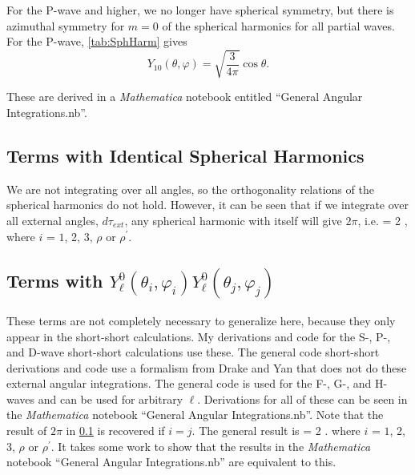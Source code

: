 \documentclass[Dissertation.tex]{subfiles}
\begin{document}
For the P-wave and higher, we no longer have spherical symmetry, but there is
azimuthal symmetry for $m = 0$ of the spherical harmonics for all partial 
waves. For the P-wave,
\cref{tab:SphHarm} gives
\begin{equation}
Y_{10}(\theta,\varphi) = \sqrt{\frac{3}{4\pi}} \cos\theta.
\end{equation}






These are derived in a \emph{Mathematica} notebook entitled ``General Angular Integrations.nb''.



\subsection{Terms with Identical Spherical Harmonics}
\label{sec:AngSame}
We are not integrating over all angles, so the orthogonality relations of the
spherical harmonics do not hold. However, it can be seen that if we integrate
over all external angles, $d\tau_{ext}$, any spherical harmonic with itself
will give $2\pi$, i.e.
\beq
\label{eq:AngSame}
 = 2 \pi,
\eeq
where $i$ = $1$, 2, 3, $\rho$ or $\rho^\prime$.


\subsection{Terms with \texorpdfstring{$Y_\ell^0(\theta_i, \varphi_i) Y_\ell^0(\theta_j, \varphi_j)$}{Yi-Yj} }
\label{sec:AngRiRj}

These terms are not completely necessary to generalize here, because they 
only appear in the short-short calculations. My derivations and code for the 
S-, P-, and D-wave short-short calculations use these. The general code
short-short derivations and code \cite{sec:} use a formalism from Drake and
Yan \cite{Yan1997} that does not do these external angular integrations. The 
general code is used for the F-, G-, and H-waves and can be used for 
arbitrary $\ell$. Derivations for all of these can be seen in the
\emph{Mathematica} notebook ``General Angular Integrations.nb''. Note that the
result of $2\pi$ in \cref{sec:AngSame} is recovered if $i=j$. The general 
result is
\beq
\label{eq:AngRiRj}
 = 2 \pi {}.
\eeq
where $i$ = $1$, 2, 3, $\rho$ or $\rho^\prime$. It takes some work to show that the results in the \emph{Mathematica} notebook ``General Angular Integrations.nb'' are equivalent to this.
\end{document}
